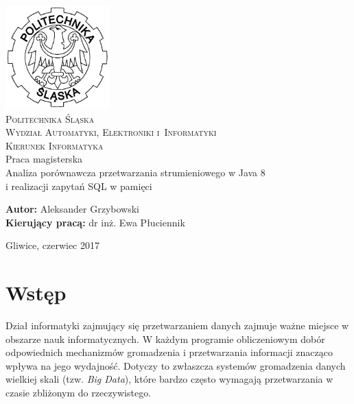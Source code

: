 \documentclass[12pt,twoside,openright]{extarticle}
\begin{document}
\begin{titlepage}
    \begin{center}
        \includegraphics[width=4cm]{polsl.png}\\[1cm]
        \textsc{\LARGE{Politechnika Śląska}}\\[0.5cm]
        \textsc{\LARGE{Wydział Automatyki, Elektroniki i~Informatyki}}\\[0.5cm]
        \textsc{\LARGE{Kierunek Informatyka}}\\[2.5cm]
        \LARGE{Praca magisterska}\\[1cm]
        \begingroup
            \fontsize{14pt}{17pt}\selectfont
            Analiza porównawcza przetwarzania strumieniowego w Java 8 \\ i realizacji zapytań SQL w pamięci
        \endgroup
    \end{center}
    \vspace{2cm}
    \begingroup
        \fontsize{14pt}{17pt}\selectfont
        \textbf{Autor:} Aleksander Grzybowski\\
        \textbf{Kierujący pracą:} dr inż. Ewa Płuciennik\\
    \endgroup

    \vspace{2.0cm}
    \begingroup
        \fontsize{12pt}{14pt}\selectfont
        \begin{center}
        Gliwice, czerwiec 2017
        \end{center}
    \endgroup
\end{titlepage}

\clearpage\mbox{}\clearpage

\tableofcontents

\newpage

\section{Wstęp}

    Dział informatyki zajmujący się przetwarzaniem danych zajmuje ważne miejsce w obszarze nauk informatycznych. W każdym programie obliczeniowym dobór odpowiednich mechanizmów gromadzenia i przetwarzania informacji znacząco wpływa na jego wydajność. Dotyczy to zwłaszcza systemów gromadzenia danych wielkiej skali (tzw. \textit{Big Data}), które bardzo często wymagają przetwarzania w czasie zbliżonym do rzeczywistego.
\end{document}
